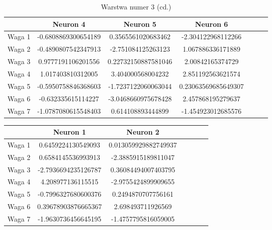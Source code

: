 \documentclass{classrep}
\begin{document}
{        \begin{table}[!htbp]
            \centering
            \begin{tabular}{|c|c|c|c|c|c|l|}
            \hline
                   & Neuron 4      & Neuron 5      & Neuron 6        \\ \hline
            Waga 1 & -0.6808869300654189              & 0.3565561020683462              & -2.304122968112266                \\ \hline
            Waga 2 & -0.4890807542347913              & -2.751084125263123              & 1.067886336171889                \\ \hline
            Waga 3 & 0.9777191106201556              & 0.22732150887581046              & 2.00842165374729                \\ \hline
            Waga 4 & 1.017403810312005              & 3.404000568004232              & 2.851192563621574                \\ \hline
            Waga 5 & -0.5950758846368603              & -1.7237122060063044              & 0.23063569685649307                \\ \hline
            Waga 6 & -0.632335615114227              & -3.0468660975678428              & 2.457868195279637                \\ \hline
            Waga 7 & -1.0787080615548403              & 0.614108893444899              & -1.454923012685576                \\ \hline

            \end{tabular}
            \caption{Warstwa numer 3 (cd.)}
            \end{table}
        \FloatBarrier


        \begin{table}[!htbp]
            \centering
            \begin{tabular}{|c|c|c|c|c|c|l|}
            \hline
                    & Neuron 1                          & Neuron 2                               \\ \hline
            Waga 1 & 0.6459224130549093              &  0.013059929882749937              \\ \hline
            Waga 2 & 0.6584145536993913              &  -2.3885915189811047              \\ \hline
            Waga 3 & -2.7936694235126787              &  0.36084494007403795              \\ \hline
            Waga 4 & 4.208977136115515                  &   -2.9755424899909655             \\ \hline
            Waga 5 & -0.7996327680600376              & 0.2494870707756161               \\ \hline
            Waga 6 & 0.39678903876665367              &  2.698493711926569              \\ \hline
            Waga 7 & -1.9630736456645195              &  -1.4757795816059005              \\ \hline


\end{tabular}
\end{table}}
\end{document}
